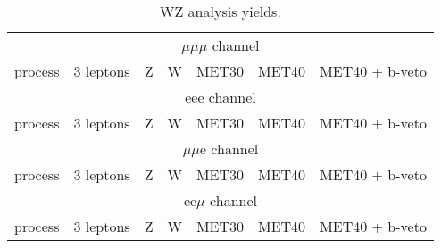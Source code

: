 \documentclass[a4paper]{article}
\begin{document}
\begin{table}[ht]
\begin{center}
\begin{tabular}{l|r|r|r|r|r|r}
\hline
\multicolumn{7}{c}{$\mu\mu\mu$ channel}\\
process & 3 leptons & Z & W & MET30 & MET40 & MET40 + b-veto\\
\hline

\hline
\hline
\multicolumn{7}{c}{eee channel}\\
process & 3 leptons & Z & W & MET30 & MET40 & MET40 + b-veto\\
\hline

\hline
\hline
\multicolumn{7}{c}{$\mu\mu$e channel}\\
process & 3 leptons & Z & W & MET30 & MET40 & MET40 + b-veto\\
\hline

\hline
\hline
\multicolumn{7}{c}{ee$\mu$ channel}\\
process & 3 leptons & Z & W & MET30 & MET40 & MET40 + b-veto\\
\hline

\hline
\end{tabular}
\caption{WZ analysis yields.}
\label{tab:wz_yields}
\end{center}
\end{table}
\end{document}
